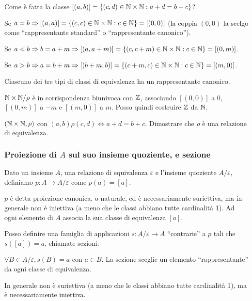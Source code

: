 Come \`e fatta la classe $[(a,b)] = \left \{ (c,d) \in \mathbb{N} \times \mathbb{N} : a + d = b + c \right\}$?

Se $a = b \Rightarrow [(a,a)] = \left \{ (c,c) \in \mathbb{N} \times \mathbb{N} : c \in \mathbb{N} \right\} = [(0,0)]$ (la coppia $(0,0)$ la scelgo come ``rappresentante standard'' o ``rappresentante canonico'').

Se $a < b \Rightarrow b = a + m \Rightarrow [(a,a+m)] = \left \{ (c, c + m) \in \mathbb{N} \times \mathbb{N} : c \in \mathbb{N}\right\} = [(0,m)]$.

Se $a > b \Rightarrow a = b + m \Rightarrow [(b + m, b)] = \left \{ (c + m, c) \in \mathbb{N} \times \mathbb{N} : c \in \mathbb{N}\right\} = [(m,0)]$.

Ciascuno dei tre tipi di classi di equivalenza ha un rappresentante canonico.

$\mathbb{N} \times \mathbb{N} / \rho$ \`e in corrispondenza biunivoca con $\mathbb{Z}$, associando $[(0,0)]$ a 0, $[(0,m)]$ a $-m$ e $[(m,0)]$ a $m$. Posso quindi costruire $\mathbb{Z}$ da $\mathbb{N}$.

\begin{esercizio}
$(\mathbb{N} \times \mathbb{N}, \rho)$ con $(a,b) \rho (c,d) \iff a + d = b + c$. Dimostrare che $\rho$ \`e una relazione di equivalenza.
\end{esercizio}

\subsubsection{Proiezione di $A$ sul suo insieme quoziente, e sezione}

\begin{defn}[Proiezione]
Dato un insieme $A$, una relazione di equivalenza $\varepsilon$ e l'insieme quoziente $A / \varepsilon$, definiamo $p : A \to A / \varepsilon $ come $ p(a) = [a]$.
\end{defn}
$p$ \`e detta proiezione canonica, o naturale, ed \`e necessariamente suriettiva, ma in generale non \`e iniettiva (a meno che le classi abbiano tutte cardinalit\`a 1). Ad ogni elemento di $A$ associa la sua classe di equivalenza $[a]$.

Posso definire una famiglia di applicazioni $s : A / \varepsilon \to A $ ``contrarie'' a $p$ tali che $s([a]) = a$, chiamate sezioni.
\begin{defn}[Sezione]
$\forall B \in A / \varepsilon , s(B) = a$ con $a \in B$. La sezione sceglie un elemento ``rappresentante'' da ogni classe di equivalenza. 
\end{defn}
In generale non \`e suriettiva (a meno che le classi abbiano tutte cardinalit\`a 1), ma \`e necessariamente iniettiva.

